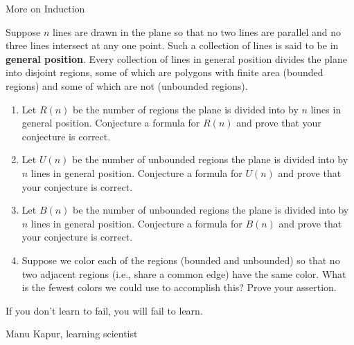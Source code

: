 \begin{section}{More on Induction}
\begin{problem}
Suppose $n$ lines are drawn in the plane so that no two lines are parallel and no three lines intersect at any one point. Such a collection of lines is said to be in \textbf{general position}. Every collection of lines in general position divides the plane into disjoint regions, some of which are polygons with finite area (bounded regions) and some of which are not (unbounded regions).
\begin{enumerate}[label=\textrm{(\alph*)}]
\item Let $R(n)$ be the number of regions the plane is divided into by $n$ lines in general position.  Conjecture a formula for $R(n)$ and prove that your conjecture is correct.
\item Let $U(n)$ be the number of unbounded regions the plane is divided into by $n$ lines in general position.  Conjecture a formula for $U(n)$ and prove that your conjecture is correct.
\item Let $B(n)$ be the number of unbounded regions the plane is divided into by $n$ lines in general position.  Conjecture a formula for $B(n)$ and prove that your conjecture is correct.
\item Suppose we color each of the regions (bounded and unbounded) so that no two adjacent regions (i.e., share a common edge) have the same color.  What is the fewest colors we could use to accomplish this?  Prove your assertion.
\end{enumerate}
\end{problem} 

\epigraph{If you don't learn to fail, you will fail to learn.}{Manu Kapur, learning scientist}

\end{section}